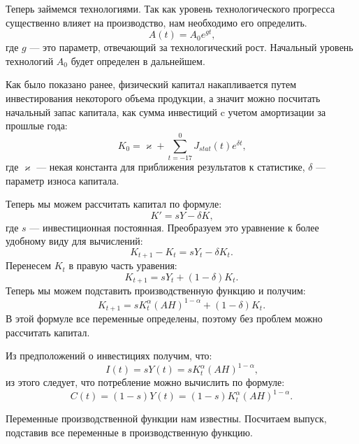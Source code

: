 Теперь займемся технологиями.
Так как уровень технологического прогресса существенно влияет на производство, нам необходимо его определить.
\begin{equation*}
A(t) = A_{0}e^{gt}\text{,}
\end{equation*}
где $g$ --- это параметр, отвечающий за технологический рост.
Начальный уровень технологий $A_0$ будет определен в дальнейшем.

Как было показано ранее, физический капитал накапливается путем инвестирования некоторого объема продукции, а значит можно посчитать начальный запас капитала, как сумма инвестиций c учетом амортизации за прошлые года:
\begin{equation*}
	K_0= \varkappa + \sum\limits_{t = -17}^{0}J_{stat}(t) e^{\delta t}\text{,}
\end{equation*}
где $\varkappa$ --- некая константа для приближения результатов к статистике, $\delta$ --- параметр износа капитала.

Теперь мы можем рассчитать капитал по формуле:
\begin{equation*}
	K'=sY - \delta K \text{,}
\end{equation*}
где $s$ --- инвестиционная постоянная.
Преобразуем это уравнение к более удобному виду для вычислений:
\begin{equation*}
	K_{t+1} - K_{t} = sY_t - \delta K_{t}\text{.}
\end{equation*}
Перенесем $K_{t}$ в правую часть уравения:
\begin{equation*}
K_{t+1} = s Y_t + (1 - \delta)K_{t}\text{.}
\end{equation*}
Теперь мы можем подставить производственную функцию и получим:
\begin{equation*}
	K_{t+1} = sK_{t}^{\alpha}(AH)^{1-\alpha} + (1 - \delta)K_{t}\text{.}
\end{equation*}
В этой формуле все переменные определены, поэтому без проблем можно рассчитать капитал.

Из предположений о инвестициях получим, что:
\begin{equation*}
	I(t)=sY(t)=sK_{t}^{\alpha}(AH)^{1-\alpha}\text{,}
\end{equation*}
из этого следует, что потребление можно вычислить по формуле:
\begin{equation*}
	C(t) = (1-s)Y(t)= (1-s)K_{t}^{\alpha}(AH)^{1-\alpha}\text{.}
\end{equation*}

Переменные производственной функции нам известны.
Посчитаем выпуск, подставив все переменные в производственную функцию.

